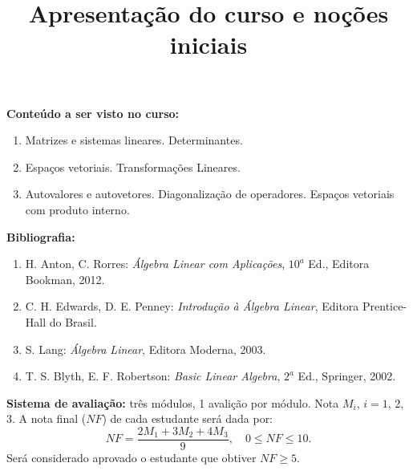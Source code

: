 \documentclass{beamer}
\title{Apresentação do curso e noções iniciais}
\author[\autor]{\autor}
\institute[\instituto]{\instituto}
\date{}
\begin{document}
    \begin{frame}
        \maketitle
    \end{frame}


    \begin{frame}
        \textbf{Conteúdo a ser visto no curso:}
        \begin{enumerate}[label={\roman*})]
            \item Matrizes e sistemas lineares. Determinantes.

            \item Espaços vetoriais. Transformações Lineares.

            \item Autovalores e autovetores. Diagonalização de operadores. Espaços vetoriais com produto interno.
        \end{enumerate}
    \end{frame}

    \begin{frame}
        {\bf Bibliografia:}
        \begin{enumerate}[label={\arabic*})]
            \item H. Anton, C. Rorres: {\it {\'A}lgebra Linear com Aplicações}, $10^a$ Ed., Editora Bookman, 2012.

        \item C. H. Edwards, D. E. Penney: {\it Introdução à Álgebra Linear}, Editora Prentice-Hall do Brasil.

            \item S. Lang: {\it Álgebra Linear}, Editora Moderna, 2003.

            \item T. S. Blyth, E. F. Robertson: {\it Basic Linear Algebra}, $2^a$ Ed., Springer, 2002.
        \end{enumerate}
    \end{frame}

    \begin{frame}
        {\bf{Sistema de avaliação:}} três módulos, 1 avalição por módulo.
            Nota $M_i$, $i=1$, 2, 3. A nota final ($NF$) de cada estudante ser\'a dada por:
        \[
            NF = \dfrac{2M_1 + 3M_2 + 4M_3}{9}, \quad 0 \le NF \le 10.
        \]
        Ser\'a considerado aprovado o estudante que obtiver $NF \ge 5$.
    \end{frame}
\end{document}
